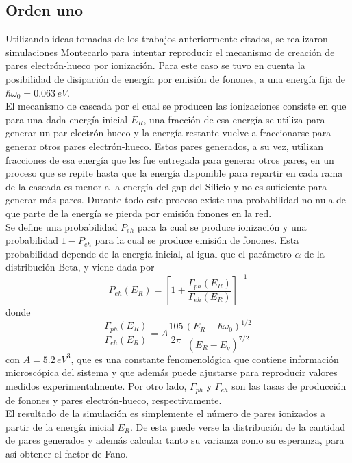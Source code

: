 \subsection{Orden uno}
\noindent Utilizando ideas tomadas de los trabajos anteriormente citados, se realizaron simulaciones Montecarlo para intentar reproducir el mecanismo de creación de pares electrón-hueco por ionización. Para este caso se tuvo en cuenta la posibilidad de disipación de energía por emisión de fonones, a una energía fija de $\hbar\omega_{0} = 0.063\,eV$.\\
\indent El mecanismo de cascada por el cual se producen las ionizaciones consiste en que para una dada energía inicial $E_{R}$, una fracción de esa energía se utiliza para generar un par electrón-hueco y la energía restante vuelve a fraccionarse para generar otros pares electrón-hueco. Estos pares generados, a su vez, utilizan fracciones de esa energía que les fue entregada para generar otros pares, en un proceso que se repite hasta que la energía disponible para repartir en cada rama de la cascada es menor a la energía del gap del Silicio y no es suficiente para generar más pares. Durante todo este proceso existe una probabilidad no nula de que parte de la energía se pierda por emisión fonones en la red.\\
\indent Se define una probabilidad $P_{eh}$ para la cual se produce ionización y una probabilidad $1 - P_{eh}$ para la cual se produce emisión de fonones. Esta probabilidad depende de la energía inicial, al igual que el parámetro $\alpha$ de la distribución Beta, y viene dada por
\begin{equation}
    P_{eh}(E_{R}) = 
    \left[
        1 + \frac{\Gamma_{ph}(E_{R})}{\Gamma_{eh}(E_{R})}
    \right]^{-1}
        \label{ec:ProbabilidadIonizacion}
\end{equation}
donde 
\begin{equation*}
    \frac{\Gamma_{ph}(E_{R})}{\Gamma_{eh}(E_{R})}
    = A\frac{105}{2\pi}\frac{(E_{R} - \hbar \omega_{0})^{1/2}}{(E_{R} - E_{g})^{7/2}}
\end{equation*}
con $A = 5.2\,eV^{3}$, que es una constante fenomenológica que contiene información microscópica del sistema y que además puede ajustarse para reproducir valores medidos experimentalmente. Por otro lado, $\Gamma_{ph}$ y $\Gamma_{eh}$ son las tasas de producción de fonones y pares electrón-hueco, respectivamente.\\
\indent El resultado de la simulación es simplemente el número de pares ionizados a partir de la energía inicial $E_{R}$. De esta puede verse la distribución de la cantidad de pares generados y además calcular tanto su varianza como su esperanza, para así obtener el factor de Fano.\\

